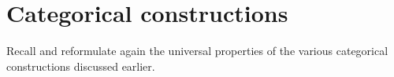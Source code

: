 
\section{Categorical constructions}


Recall and reformulate again the universal properties of the various categorical constructions discussed earlier.

